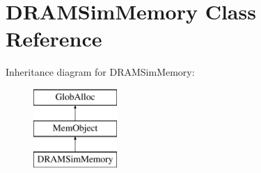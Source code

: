 \hypertarget{classDRAMSimMemory}{\section{D\-R\-A\-M\-Sim\-Memory Class Reference}
\label{classDRAMSimMemory}
}
Inheritance diagram for D\-R\-A\-M\-Sim\-Memory\-:\begin{figure}[H]
\begin{center}
\leavevmode
\includegraphics[height=3.000000cm]{classDRAMSimMemory}
\end{center}
\end{figure}
